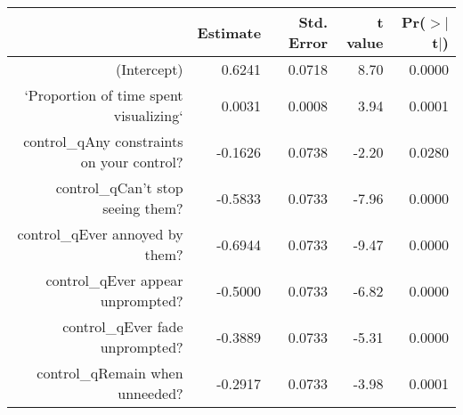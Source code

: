 \begin{table}[ht]
\centering
\begin{tabular}{rrrrr}
  \hline
 & Estimate & Std. Error & t value & Pr($>$$|$t$|$) \\ 
  \hline
(Intercept) & 0.6241 & 0.0718 & 8.70 & 0.0000 \\ 
  `Proportion of time spent visualizing` & 0.0031 & 0.0008 & 3.94 & 0.0001 \\ 
  control\_qAny constraints on your control? & -0.1626 & 0.0738 & -2.20 & 0.0280 \\ 
  control\_qCan't stop seeing them? & -0.5833 & 0.0733 & -7.96 & 0.0000 \\ 
  control\_qEver annoyed by them? & -0.6944 & 0.0733 & -9.47 & 0.0000 \\ 
  control\_qEver appear unprompted? & -0.5000 & 0.0733 & -6.82 & 0.0000 \\ 
  control\_qEver fade unprompted? & -0.3889 & 0.0733 & -5.31 & 0.0000 \\ 
  control\_qRemain when unneeded? & -0.2917 & 0.0733 & -3.98 & 0.0001 \\ 
   \hline
\end{tabular}
\end{table}
